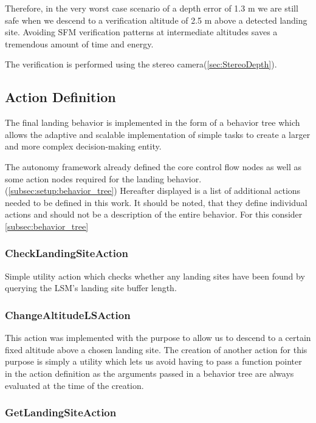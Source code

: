 Therefore, in the very worst case scenario of a depth error of 1.3 m we are still safe when we descend to a verification altitude of 2.5 m above a detected landing site. Avoiding SFM verification patterns at intermediate altitudes saves a tremendous amount of time and energy.

The verification is performed using the stereo camera(\ref{sec:StereoDepth}).



\subsection{Action Definition}
The final landing behavior is implemented in the form of a behavior tree which allows the adaptive and scalable implementation of simple tasks to create a larger and more complex decision-making entity.

The autonomy framework already defined the core control flow nodes as well as some action nodes required for the landing behavior. (\ref{subsec:setup:behavior_tree}) Hereafter displayed is a list of additional actions needed to be defined in this work. It should be noted, that they define individual actions and should not be a description of the entire behavior. For this consider \cref{subsec:behavior_tree}

\subsubsection{CheckLandingSiteAction}

Simple utility action which checks whether any landing sites have been found by querying the LSM's landing site buffer length.

\subsubsection{ChangeAltitudeLSAction}

This action was implemented with the purpose to allow us to descend to a certain fixed altitude above a chosen landing site. The creation of another action for this purpose is simply a utility which lets us avoid having to pass a function pointer in the action definition as the arguments passed in a behavior tree are always evaluated at the time of the creation.





\subsubsection{GetLandingSiteAction}

